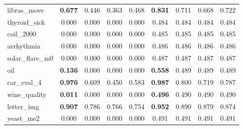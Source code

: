 \begin{figure}[ht]
\begin{tabular}{p{22mm}|*4{p{14mm}}|*4{p{14mm}}}
        libras\_move&\multicolumn{1}{c}{\textbf{0.677}}&\multicolumn{1}{c}{0.446}&\multicolumn{1}{c}{0.363}&\multicolumn{1}{c|}{0.468}&\multicolumn{1}{c}{\textbf{0.831}}&\multicolumn{1}{c}{0.711}&\multicolumn{1}{c}{0.668}&\multicolumn{1}{c}{0.722}\\
        thyroid\_sick&\multicolumn{1}{c}{0.000}&\multicolumn{1}{c}{0.000}&\multicolumn{1}{c}{0.000}&\multicolumn{1}{c|}{0.000}&\multicolumn{1}{c}{0.484}&\multicolumn{1}{c}{0.484}&\multicolumn{1}{c}{0.484}&\multicolumn{1}{c}{0.484}\\
        coil\_2000&\multicolumn{1}{c}{0.000}&\multicolumn{1}{c}{0.000}&\multicolumn{1}{c}{0.000}&\multicolumn{1}{c|}{0.000}&\multicolumn{1}{c}{0.485}&\multicolumn{1}{c}{0.485}&\multicolumn{1}{c}{0.485}&\multicolumn{1}{c}{0.485}\\
        arrhythmia&\multicolumn{1}{c}{0.000}&\multicolumn{1}{c}{0.000}&\multicolumn{1}{c}{0.000}&\multicolumn{1}{c|}{0.000}&\multicolumn{1}{c}{0.486}&\multicolumn{1}{c}{0.486}&\multicolumn{1}{c}{0.486}&\multicolumn{1}{c}{0.486}\\
        solar\_flare\_m0&\multicolumn{1}{c}{0.000}&\multicolumn{1}{c}{0.000}&\multicolumn{1}{c}{0.000}&\multicolumn{1}{c|}{0.000}&\multicolumn{1}{c}{0.487}&\multicolumn{1}{c}{0.487}&\multicolumn{1}{c}{0.487}&\multicolumn{1}{c}{0.487}\\
        oil&\multicolumn{1}{c}{\textbf{0.136}}&\multicolumn{1}{c}{0.000}&\multicolumn{1}{c}{0.000}&\multicolumn{1}{c|}{0.000}&\multicolumn{1}{c}{\textbf{0.558}}&\multicolumn{1}{c}{0.489}&\multicolumn{1}{c}{0.489}&\multicolumn{1}{c}{0.489}\\
        car\_eval\_4&\multicolumn{1}{c}{\textbf{0.976}}&\multicolumn{1}{c}{0.609}&\multicolumn{1}{c}{0.450}&\multicolumn{1}{c|}{0.583}&\multicolumn{1}{c}{\textbf{0.987}}&\multicolumn{1}{c}{0.800}&\multicolumn{1}{c}{0.719}&\multicolumn{1}{c}{0.787}\\
        wine\_quality&\multicolumn{1}{c}{\textbf{0.011}}&\multicolumn{1}{c}{0.000}&\multicolumn{1}{c}{0.000}&\multicolumn{1}{c|}{0.000}&\multicolumn{1}{c}{\textbf{0.496}}&\multicolumn{1}{c}{0.490}&\multicolumn{1}{c}{0.490}&\multicolumn{1}{c}{0.490}\\
        letter\_img&\multicolumn{1}{c}{\textbf{0.907}}&\multicolumn{1}{c}{0.786}&\multicolumn{1}{c}{0.766}&\multicolumn{1}{c|}{0.754}&\multicolumn{1}{c}{\textbf{0.952}}&\multicolumn{1}{c}{0.890}&\multicolumn{1}{c}{0.879}&\multicolumn{1}{c}{0.874}\\
        yeast\_me2&\multicolumn{1}{c}{0.000}&\multicolumn{1}{c}{0.000}&\multicolumn{1}{c}{0.000}&\multicolumn{1}{c|}{0.000}&\multicolumn{1}{c}{0.491}&\multicolumn{1}{c}{0.491}&\multicolumn{1}{c}{0.491}&\multicolumn{1}{c}{0.491}\\

\end{tabular}
\end{figure}
